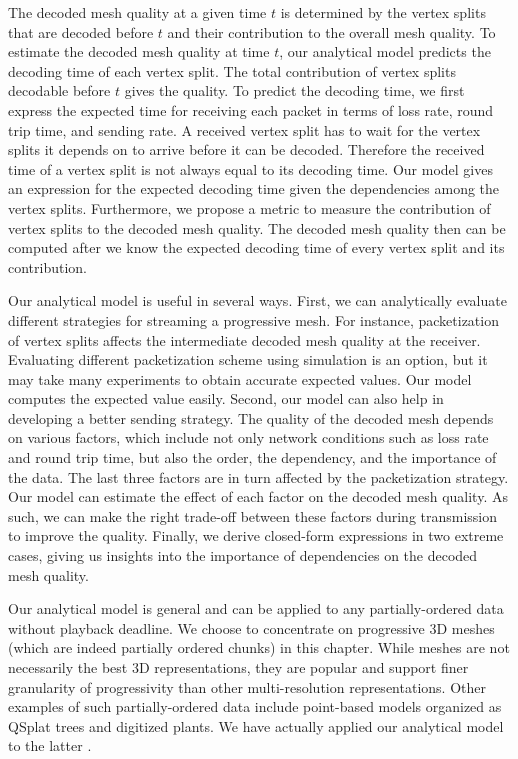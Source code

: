     The decoded mesh quality at a given time $t$ is determined by 
    the vertex splits that are decoded before $t$ and their contribution to the overall mesh quality.
    To estimate the decoded mesh quality at time $t$, our analytical model
    predicts the decoding time of each vertex split.  The total contribution of vertex
    splits decodable before $t$ gives the quality.  To predict the decoding time, we first
    express the expected time for receiving each packet
        in terms of loss rate, round trip time, and sending rate.
    A received vertex split has to wait for the vertex splits
    it depends on to arrive before it can be decoded.
    Therefore the received time of a vertex split is not always equal to its decoding
    time.  Our model gives an expression for the expected
    decoding time given the dependencies among the vertex splits.
    Furthermore, we propose
    a metric to measure the contribution of 
    vertex splits to the
    decoded mesh quality. The decoded mesh quality then can be computed 
    after we know the expected decoding time of every vertex split
    and its contribution.

    Our analytical model is useful in several ways.  First,
    we can analytically evaluate different strategies for streaming
    a progressive mesh.  For instance, packetization of vertex
    splits affects the intermediate decoded mesh quality
    at the receiver.  Evaluating different packetization scheme
    using simulation is an option, but
    it may take many experiments to obtain accurate
    expected values.  Our model computes the expected value easily.
    Second, our model can also help in developing a better sending
    strategy.  The quality of the decoded mesh depends on
    various factors, which include not only network conditions such
    as loss rate and round trip time, but also the order, the
    dependency, and the importance of the data.
    The last three factors are in turn affected by the packetization
    strategy.  Our model can estimate the effect of each factor on the
    decoded mesh quality.
    As such, we can make the right trade-off between these factors
    during transmission to improve the quality.
    Finally, we derive closed-form expressions in two extreme cases,
    giving us insights into the importance of dependencies on the
    decoded mesh quality.

    Our analytical model is general and can be applied to any 
    partially-ordered data without playback deadline.  We
    choose to concentrate on progressive 3D meshes (which are indeed 
    partially ordered chunks) in this chapter. 
    While meshes are not necessarily the best 3D representations, they 
    are popular and support finer granularity of progressivity 
    than other multi-resolution representations. 
    Other examples of such partially-ordered data include point-based models 
    organized as QSplat trees \cite{rusinkiewicz:qsplat} and digitized plants.  
    We have actually applied our analytical model to the latter \cite{plant:seb}.
    

